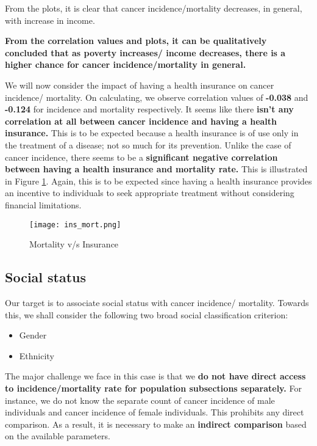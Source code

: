 \documentclass[conference]{IEEEtran}
\begin{document}
From the plots, it is clear that cancer incidence/mortality decreases, in general, with increase in income.

\textbf{ From the correlation values and plots, it can be qualitatively concluded that as poverty increases/ income decreases, there is a higher chance for cancer incidence/mortality in general.}

We will now consider the impact of having a health insurance on cancer incidence/ mortality. On calculating, we observe correlation values of \textbf{-0.038} and \textbf{-0.124} for incidence and mortality respectively. It seems like there \textbf{isn't any correlation at all between cancer incidence and having a health insurance.} This is to be expected because a health insurance is of use only in the treatment of a disease; not so much for its prevention. Unlike the case of cancer incidence, there seems to be a \textbf{significant negative correlation between having a health insurance and mortality rate.} This is illustrated in Figure \ref{ins_mort}. Again, this is to be expected since having a health insurance provides an incentive to individuals to seek appropriate treatment without considering financial limitations.

\begin{figure}[tbh]
\centering
\texttt{[image: ins\_mort.png]}
\caption{Mortality v/s Insurance}
\label{ins_mort}
\end{figure}

\subsection{Social status}

Our target is to associate social status with cancer incidence/ mortality. Towards this, we shall consider the following two broad social classification criterion:

\begin{itemize}
    \item Gender
    \item Ethnicity
\end{itemize}

The major challenge we face in this case is that we \textbf{do not have direct access to incidence/mortality rate for population subsections separately.} For instance, we do not know the separate count of cancer incidence of male individuals and cancer incidence of female individuals. This prohibits any direct comparison. As a result, it is necessary to make an \textbf{indirect comparison} based on the available parameters.
\end{document}
